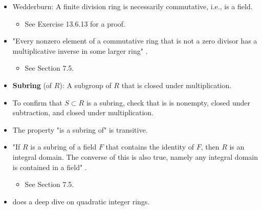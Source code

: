 \documentclass[../notes.tex]{subfiles}
\begin{document}
\begin{itemize}
\begin{proposition}
    \end{proposition}
    \begin{corollary}\label{cly:7.3}
        Any finite integral domain is a field.
        \begin{proof}
            Let $R$ be a finite integral domain, and $a$ be an arbitrary, nonzero element of $R$. We seek to find $b$ such that $ab=1$, which will imply that $a$ (i.e., every element) is a unit in $R$.\par
            Define the map $x\mapsto ax$. By the cancellation law, this map is injective. Injectivity plus the fact that $R$ is finite proves that this map is surjective. Thus, there exists $b\in R$ such that $ab=1$, as desired.
        \end{proof}
    \end{corollary}
    \item Wedderburn: A finite division ring is necessarily commutative, i.e., is a field.
    \begin{itemize}
        \item See Exercise 13.6.13 for a proof.
    \end{itemize}
    \item "Every nonzero element of a commutative ring that is not a zero divisor has a multiplicative inverse in some larger ring" \parencite[228]{bib:DummitFoote}.
    \begin{itemize}
        \item See Section 7.5.
    \end{itemize}
    \item \textbf{Subring} (of $R$): A subgroup of $R$ that is closed under multiplication.
    \item To confirm that $S\subset R$ is a subring, check that is is nonempty, closed under subtraction, and closed under multiplication.
    \item The property "is a subring of" is transitive.
    \item "If $R$ is a subring of a field $F$ that contains the identity of $F$, then $R$ is an integral domain. The converse of this is also true, namely any integral domain is contained in a field" \parencite[229]{bib:DummitFoote}.
    \begin{itemize}
        \item See Section 7.5.
    \end{itemize}
    \item \textcite{bib:DummitFoote} does a deep dive on quadratic integer rings.
\end{itemize}
\end{document}
